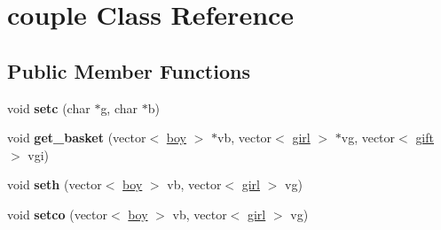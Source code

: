 \hypertarget{classcouple}{}\section{couple Class Reference}
\label{classcouple}
\subsection*{Public Member Functions}
\begin{DoxyCompactItemize}
\item 
void {\bfseries setc} (char $\ast$g, char $\ast$b)\hypertarget{classcouple_ae673ab07084547f348973ea89680d4a2}{}\label{classcouple_ae673ab07084547f348973ea89680d4a2}

\item 
void {\bfseries get\+\_\+basket} (vector$<$ \hyperlink{classboy}{boy} $>$ $\ast$vb, vector$<$ \hyperlink{classgirl}{girl} $>$ $\ast$vg, vector$<$ \hyperlink{classgift}{gift} $>$ vgi)\hypertarget{classcouple_a1217dd7999df21cc1a5d9a16fd860a30}{}\label{classcouple_a1217dd7999df21cc1a5d9a16fd860a30}

\item 
void {\bfseries seth} (vector$<$ \hyperlink{classboy}{boy} $>$ vb, vector$<$ \hyperlink{classgirl}{girl} $>$ vg)\hypertarget{classcouple_a4947dc6b8027f06b3365db5c646f57cf}{}\label{classcouple_a4947dc6b8027f06b3365db5c646f57cf}

\item 
void {\bfseries setco} (vector$<$ \hyperlink{classboy}{boy} $>$ vb, vector$<$ \hyperlink{classgirl}{girl} $>$ vg)\hypertarget{classcouple_a011e00c2baac81a119a052c8e616ca09}{}\label{classcouple_a011e00c2baac81a119a052c8e616ca09}

\end{DoxyCompactItemize}
